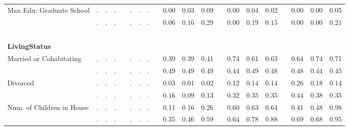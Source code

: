 \begin{center}
{\begin{longtable}{L{5cm} c c c p{.5cm} c c c p{.5cm} c c c p{.5cm} c c c p{.5cm} c c c}
 \quad Max Edu: Graduate School & . &         . &         . & &         . &         . &         . & &      0.00 &      0.03 &      0.09 & &      0.00 &      0.04 &      0.02 & &      0.00 &      0.00 &      0.05 \\*
 \quad & $\mathit{        .}$ & $\mathit{        .}$ & $\mathit{        .}$ & & $\mathit{        .}$ & $\mathit{        .}$ & $\mathit{        .}$ & & $\mathit{     0.06}$ & $\mathit{     0.16}$ & $\mathit{     0.29}$ & & $\mathit{     0.00}$ & $\mathit{     0.19}$ & $\mathit{     0.15}$ & & $\mathit{     0.00}$ & $\mathit{     0.00}$ & $\mathit{     0.21}$ \\[.2em]
 ~\\[-.5em]
\textbf{LivingStatus} \\[.6em]
 \quad Married or Cohabitating & . &         . &         . & &         . &         . &         . & &      0.39 &      0.39 &      0.41 & &      0.74 &      0.61 &      0.63 & &      0.64 &      0.74 &      0.71 \\*
 \quad & $\mathit{        .}$ & $\mathit{        .}$ & $\mathit{        .}$ & & $\mathit{        .}$ & $\mathit{        .}$ & $\mathit{        .}$ & & $\mathit{     0.49}$ & $\mathit{     0.49}$ & $\mathit{     0.49}$ & & $\mathit{     0.44}$ & $\mathit{     0.49}$ & $\mathit{     0.48}$ & & $\mathit{     0.48}$ & $\mathit{     0.44}$ & $\mathit{     0.45}$ \\[.2em]
 \quad Divorced & . &         . &         . & &         . &         . &         . & &      0.03 &      0.01 &      0.02 & &      0.12 &      0.14 &      0.14 & &      0.26 &      0.18 &      0.14 \\*
 \quad & $\mathit{        .}$ & $\mathit{        .}$ & $\mathit{        .}$ & & $\mathit{        .}$ & $\mathit{        .}$ & $\mathit{        .}$ & & $\mathit{     0.16}$ & $\mathit{     0.09}$ & $\mathit{     0.13}$ & & $\mathit{     0.32}$ & $\mathit{     0.35}$ & $\mathit{     0.35}$ & & $\mathit{     0.44}$ & $\mathit{     0.38}$ & $\mathit{     0.35}$ \\[.2em]
 \quad Num. of Children in House & . &         . &         . & &         . &         . &         . & &      0.11 &      0.16 &      0.26 & &      0.60 &      0.63 &      0.64 & &      0.41 &      0.48 &      0.98 \\*
 \quad & $\mathit{        .}$ & $\mathit{        .}$ & $\mathit{        .}$ & & $\mathit{        .}$ & $\mathit{        .}$ & $\mathit{        .}$ & & $\mathit{     0.35}$ & $\mathit{     0.46}$ & $\mathit{     0.59}$ & & $\mathit{     0.64}$ & $\mathit{     0.78}$ & $\mathit{     0.88}$ & & $\mathit{     0.69}$ & $\mathit{     0.68}$ & $\mathit{     0.95}$ \\[.2em]

\end{longtable}}
\end{center}
